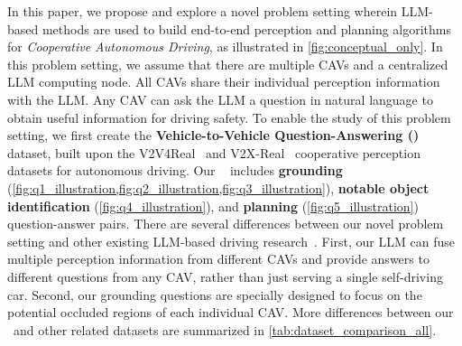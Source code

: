 In this paper, we propose and explore a novel problem setting wherein LLM-based methods are used to build end-to-end perception and planning algorithms for \emph{Cooperative Autonomous Driving},
as illustrated in \cref{fig:conceptual_only}. In this problem setting, we assume that there are multiple CAVs and a centralized LLM computing node. All CAVs share their individual perception information with the LLM. Any CAV can ask the LLM a question in natural language to obtain useful information for driving safety. To enable the study of this problem setting, we first create the \textbf{Vehicle-to-Vehicle Question-Answering (\namedataset)} dataset, built upon the V2V4Real~\cite{xu2023v2v4real} and V2X-Real~\cite{xiang2024v2xreal} cooperative perception datasets for autonomous driving. 
Our \namedataset~
includes \textbf{grounding} (\cref{fig:q1_illustration,fig:q2_illustration,fig:q3_illustration}), \textbf{notable object identification} (\cref{fig:q4_illustration}), and \textbf{planning} (\cref{fig:q5_illustration}) question-answer pairs. 
There are several differences between our novel problem setting and other existing LLM-based driving research~\cite{tian2024token, wang2024omnidrive, sima2023drivelm, marcu2023lingoqa, qian2023nuscenesqa, tencent2023maplm}. 
First, our LLM can fuse multiple perception information from different CAVs and provide answers to different questions from any CAV, rather than just serving a single self-driving car.
Second, our grounding questions are specially designed to focus on the potential occluded regions of each individual CAV. 
More differences between our \namedataset~and other related datasets are summarized in \cref{tab:dataset_comparison_all}.


